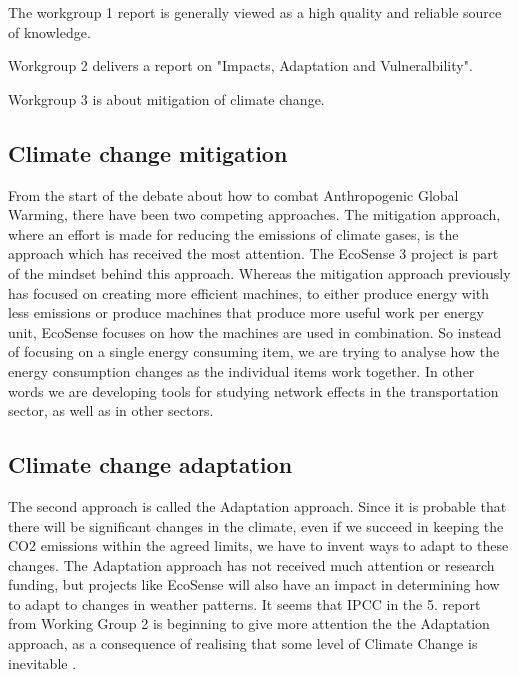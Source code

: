 The workgroup 1 report is generally viewed as a high quality and reliable source of knowledge.

Workgroup 2 delivers a report on "Impacts, Adaptation and Vulneralbility".

Workgroup 3 is about mitigation of climate change.



\subsection{Climate change mitigation}From the start of the debate about how to combat Anthropogenic Global Warming, there have been two competing approaches. The mitigation approach, where an effort is made for reducing the emissions of climate gases, is the approach which has received the most attention. The EcoSense 3 project is part of the mindset behind this approach. Whereas the mitigation approach previously has focused on creating more efficient machines, to either produce energy with less emissions or produce machines that produce more useful work per energy unit, EcoSense focuses on how the machines are used in combination\cite{Chakraborty2013}. So instead of focusing on a single energy consuming item, we are trying to analyse how the energy consumption changes as the individual items work together. In other words we are developing tools for studying network effects in the transportation sector, as well as in other sectors.


\subsection{Climate change adaptation}
The second approach is called the Adaptation approach. Since it is probable that there will be significant changes in the climate, even if we succeed in keeping the CO2 emissions within the agreed limits, we have to invent ways to adapt to these changes. The Adaptation approach has not received much attention or research funding, but projects like EcoSense will also have an impact in determining how to adapt to changes in weather patterns. It seems that IPCC in the 5. report from Working Group 2 is beginning to give more attention the the Adaptation approach, as a consequence of realising that some level of Climate Change is inevitable \cite{kelly2000}\cite{smithers1997}.

